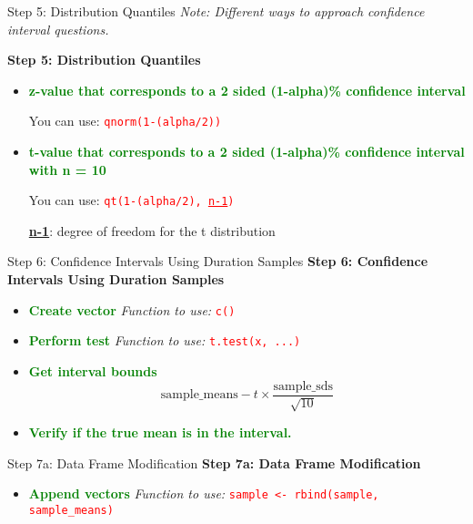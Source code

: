 \documentclass{beamer}
\begin{document}
\begin{frame}{Step 5: Distribution Quantiles}
    \textit{Note: Different ways to approach confidence interval questions.}

    \textbf{Step 5: Distribution Quantiles}
    \begin{itemize}
        \item \textcolor{green}{\textbf{z-value that corresponds to a 2 sided (1-alpha)\% confidence interval}}  
        
        \quad You can use: \textcolor{red}{\texttt{qnorm(1-(alpha/2))}}
        
        \item \textcolor{green}{\textbf{t-value that corresponds to a 2 sided (1-alpha)\% confidence interval with n = 10}}  
        
        \quad You can use: \textcolor{red}{\texttt{qt(1-(alpha/2), \underline{n-1})}}  
        
        \quad \textbf{\underline{n-1}}: degree of freedom for the t distribution
    \end{itemize}
\end{frame}
\begin{frame}{Step 6: Confidence Intervals Using Duration Samples}
    \textbf{Step 6: Confidence Intervals Using Duration Samples}
    \begin{itemize}
        \item \textcolor{green}{\textbf{Create vector}}  
        \textit{Function to use:} \textcolor{red}{\texttt{c()}}

        \item \textcolor{green}{\textbf{Perform test}}  
        \textit{Function to use:} \textcolor{red}{\texttt{t.test(x, ...)}}

        \item \textcolor{green}{\textbf{Get interval bounds}}  
        \[
        \text{sample\_means} - t \times \frac{\text{sample\_sds}}{\sqrt{10}}
        \]

        \item \textcolor{green}{\textbf{Verify if the true mean is in the interval.}}
    \end{itemize}
\end{frame}

\begin{frame}{Step 7a: Data Frame Modification}
    \textbf{Step 7a: Data Frame Modification}
    \begin{itemize}
        \item \textcolor{green}{\textbf{Append vectors}}  
        \textit{Function to use:} \textcolor{red}{\texttt{sample <- rbind(sample, sample\_means)}}
    \end{itemize}
\end{frame}
\end{document}
